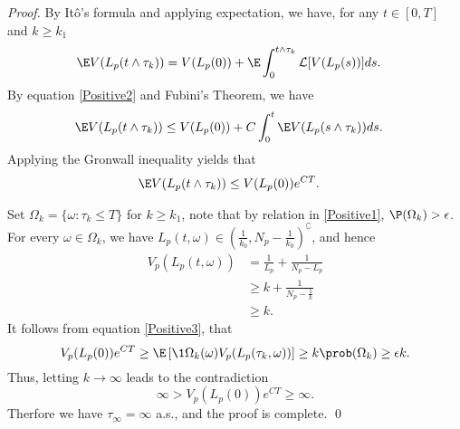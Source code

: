 \begin{proof}
		By It\^{o}'s formula and applying expectation, we have, for any 
	$t \in [0,T]$ and $k\geq k_1$
	\begin{align*}
		\E V(L_p(t\wedge\tau_k)) &= 
			V(L_p(0)) + 
			\E 
				\int_{0}^{t\wedge\tau_k} \mathcal{L}[V(L_p(s))]
			ds.
	\end{align*}
	By equation \eqref{Positive2} and Fubini's Theorem, we have
	\begin{align*}
		\E V(L_p(t\wedge\tau_k)) 
			&\leq 
				V(L_p(0)) + 
				C
				\int_{0}^{t}
					\E V(L_p(s\wedge\tau_k))
				ds.
	\end{align*}
	Applying the Gronwall inequality yields that	
	\begin{align}\label{Positive3}
		\E V(L_p(t\wedge\tau_k))&\leq V(L_p(0))e^{CT}.
	\end{align}

		Set 
	$
		\Omega_k = \{\omega : \tau_k\leq T\}
	$ for $k\geq k_1$, note that by relation in 
	\autoref{Positive1}, 
	$
		\P(\Omega_k) >  \epsilon
	$. For every 
	$
		\omega \in \Omega_k
	$, we have 
	$
		L_p(t,\omega) \in 
		\left(
			\frac{1}{k_0}, N_p - 
			\frac{1}{k_0}
		\right) ^ {\complement}
	$, and hence
	\begin{align*}
		V_p(L_p(t,\omega))
			&=
				\frac{1}{L_p} + 
				\frac{1}{N_p-L_p}
			\\
			&\geq 
				k + 
				\frac{1}{
					N_p - \frac{1}{k}}
			\\
			& \geq k.
	\end{align*}
%	
	It follows from equation \eqref{Positive3}, that
	\begin{equation*}
		V_p(L_p(0)) e^{CT}
			\geq 
			\E 
			\left[
				\1{\Omega_k} (\omega)
				V_p(L_p(\tau_k,\omega))
			\right]
			\geq k
			\prob (\Omega_k)\geq \epsilon k.
	\end{equation*}
%
	Thus, letting $k\rightarrow \infty$ leads to the contradiction
	\begin{equation*}
		\infty>V_p(L_p(0))e^{CT}\geq \infty.	
	\end{equation*}
%
	Therfore we  have $\tau_\infty=\infty$ a.s., and the proof is 
	complete. \qed
\end{proof}

